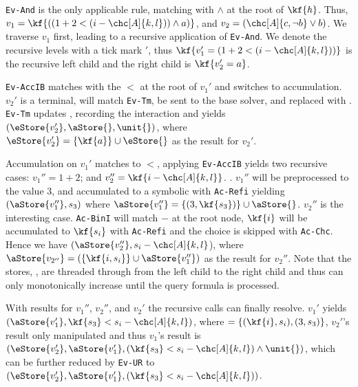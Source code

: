 \texttt{Ev-And} is the only applicable rule, matching \boolFuncs{} with $\wedge$
at the root of $\kf{h}$. Thus, $v_{1} = \kf{((1 + 2 < (i -
  \chc[A]{k,l})) \wedge a)}$, and $v_{2} = (\chc[A]{c,\neg b} \vee b)$. We
traverse $v_{1}$ first, leading to a recursive application of \texttt{Ev-And}.
We denote the recursive levels with a tick mark $'$, thus \newline{} $\kf{v_{1}' = (1 + 2 <
  (i - \chc[A]{k,l}))}$ is the recursive left child and the right child is
$\kf{v_{2}' = a}$.

\texttt{Ev-AccIB} matches \inequalities{}with the $<$ at the root of $v_{1}'$ and
switches to accumulation. $v_{2}'$ is a terminal, will match \texttt{Ev-Tm}, be
sent to the base solver, and replaced with \unit{}. \texttt{Ev-Tm} updates
\eStore{}, recording the interaction and yields $(\eStore{v_{2}'},\aStore{},
\unit{})$, where $\eStore{v_{2}'} = \{\kf{a}\} \cup \eStore{}$ as the result for
$v_{2}'$.

Accumulation on $v_{1}'$ matches \inequalities{} to $<$, applying
\texttt{Ev-AccIB} yields two recursive cases: $v_{1}'' = 1 + 2$; and $v_{2}'' =
\kf{i - \chc[A]{k,l}}$. .
%
$v_{1}''$ will be preprocessed to the value 3, and accumulated to a symbolic with
\texttt{Ac-Refi} yielding $(\aStore{v_{1}''}, s_{3})$ where $\aStore{v_{1}''} =
\{(3, \kf{s_{3}})\} \cup \aStore{}$. $v_{2}''$ is the interesting case.
\texttt{Ac-BinI} will match $-$ at the root node, $\kf{i}$ will be accumulated
to $\kf{s_{i}}$ with \texttt{Ac-Refi} and the choice is skipped with
\texttt{Ac-Chc}. Hence we have $(\aStore{v_{2}''}, s_{i} - \chc[A]{k,l}$), where
$\aStore{v_{2''}} = (\{\kf{i, s_{i}}\} \cup \aStore{v_{1}''})$ as the result for
$v_{2}''$. Note that the stores, \aeStore{}, are threaded through from the left
child to the right child and thus can only monotonically increase until the
query formula is processed.

With results for $v_{1}''$, $v_{2}''$, and $v_{2}'$ the recursive calls can finally
resolve. $v_{1}'$ yields $(\aStore{v_{1}'}, \kf{s_{3}} < s_{i} - \chc[A]{k,l})$,
where  $= \{(\kf{i}, s_{i}), (3, s_{3})\}$, $v_{2}'$'s result
only manipulated \eStore{} and thus $v_{1}$'s result is $(\eStore{v_{2}'},
\aStore{v_{1}'}, (\kf{s_{3}} < s_{i} - \chc[A]{k,l}) \wedge \unit{})$, which can
be further reduced by \texttt{Ev-UR} to \newline{} $(\eStore{v_{2}'},
\aStore{v_{1}'}, (\kf{s_{3}} < s_{i} - \chc[A]{k,l}))$.

